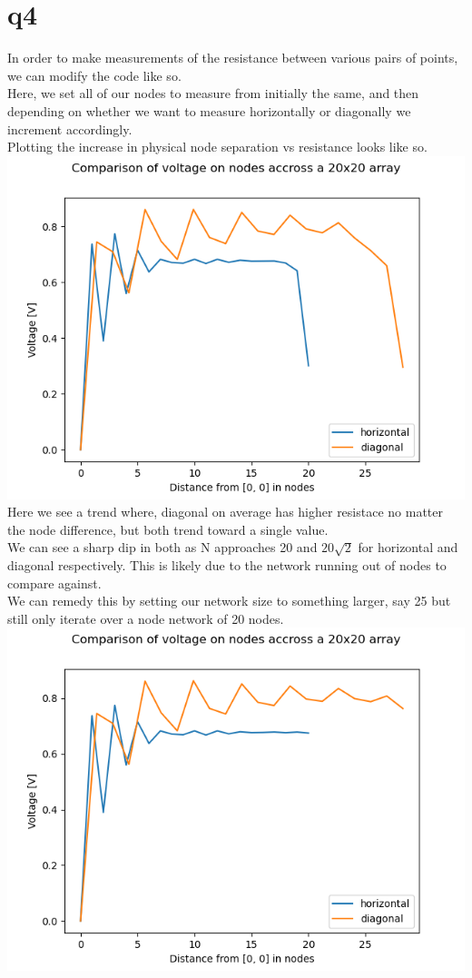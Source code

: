 \documentclass[a4paper,english]{article}
\begin{document}
    \section{q4}
    In order to make measurements of the resistance between various pairs of points, we can modify the code
    like so.
     \\
    Here, we set all of our nodes to measure from initially the same, and then depending on whether
    we want to measure horizontally or diagonally we increment accordingly.
    \\
    Plotting the increase in physical node separation vs resistance looks like so.
    \\
    \includegraphics[scale=0.74]{./q7_4.png}
    \\
    Here we see a trend where, diagonal on average has higher resistace no matter the node 
    difference, but both trend toward a single value.\\
    We can see a sharp dip in both as N approaches 20 and $20\sqrt{2}$ for horizontal and diagonal
    respectively. This is likely due to the network running out of nodes to compare against.\\
    We can remedy this by setting our network size to something larger, say 25 but still only iterate
    over a node network of 20 nodes. \\
    \includegraphics[scale=0.74]{./q7_4new.png}
\end{document}
